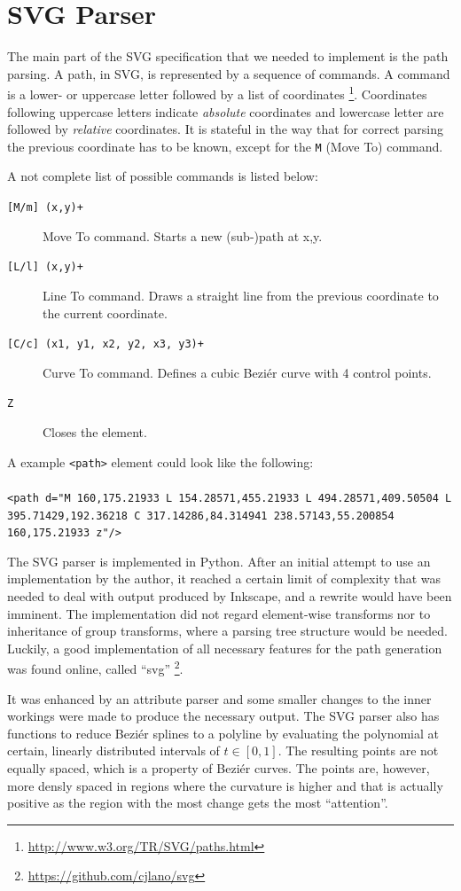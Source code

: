 \section{SVG Parser}

The main part of the SVG specification that we needed to implement is the path parsing. A path, in SVG, is represented by a sequence of commands. A command is a lower- or uppercase letter followed by a list of coordinates
\footnote{\url{http://www.w3.org/TR/SVG/paths.html}}. Coordinates following uppercase letters indicate \textit{absolute} coordinates and lowercase letter are followed by \textit{relative} coordinates. It is stateful in the way that for correct parsing the previous coordinate has to be known, except for the \texttt{M} (Move To) command.

A not complete list of possible commands is listed below:

\begin{description}
\item[\texttt{[M/m] (x,y)+}] Move To command. Starts a new (sub-)path at x,y.
\item[\texttt{[L/l] (x,y)+}] Line To command. Draws a straight line from the previous coordinate to the current coordinate.
\item[\texttt{[C/c] (x1, y1, x2, y2, x3, y3)+}] Curve To command. Defines a cubic Beziér curve with 4 control points.
\item[\texttt{Z}] Closes the element.
\end{description} 

A example \texttt{<path>} element could look like the following:\\ \\  \texttt{<path d="M 160,175.21933 L 154.28571,455.21933 L 494.28571,409.50504 L 395.71429,192.36218 C 317.14286,84.314941 238.57143,55.200854 160,175.21933 z"/>}

The SVG parser is implemented in Python. After an initial attempt to use an implementation by the author, it reached a certain limit of complexity that was needed to deal with output produced by Inkscape, and a rewrite would have been imminent. The implementation did not regard element-wise transforms nor to inheritance of group transforms, where a parsing tree structure would be needed. Luckily, a good implementation of all necessary features for the path generation was found online, called \enquote{svg} \footnote{\url{https://github.com/cjlano/svg}}.

It was enhanced by an attribute parser and some smaller changes to the inner workings were made to produce the necessary output. The SVG parser also has functions to reduce Beziér splines to a polyline by evaluating the polynomial at certain, linearly distributed intervals of $t \in [0, 1]$. The resulting points are not equally spaced, which is a property of Beziér curves. The points are, however, more densly spaced in regions where the curvature is higher and that is actually positive as the region with the most change gets the most \enquote{attention}. 

